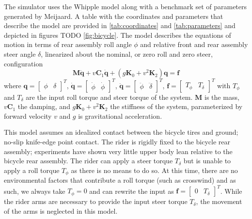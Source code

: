 \documentclass[11pt,a4paper,reqno]{amsart}
\newcommand{\mass}{\bm{M}}
\newcommand{\damping}{v \bm{C}_1}
\newcommand{\stiffness}{g \bm{K}_0 + v^2 \bm{K}_2}
\newcommand{\roll}{\phi}
\newcommand{\steer}{\delta}
\newcommand{\rollRate}{\dot{\phi}}
\newcommand{\steerRate}{\dot{\phi}}
\begin{document}
The simulator uses the Whipple model\cite{whipple1899} along with a benchmark set of parameters generated by
Meijaard\cite{meijaard2007}.
A table with the coordinates and parameters that describe the model are provided in
\autoref{tab:coordinates} and \autoref{tab:parameters} and depicted in figures TODO \autoref{fig:bicycle}.
The model describes the equations of motion in terms of rear assembly roll angle $\roll$ and relative front and rear
assembly steer angle $\steer$, linearized about the nominal, or zero roll and zero steer, configuration
\begin{equation}
    \mass \ddot{\bm{q}} + \damping \dot{\bm{q}} + (\stiffness) \bm{q} = \bm{f} \label{eq:eom}
\end{equation}
where
$ \bm{q} = \begin{bmatrix} \roll & \steer \end{bmatrix}^T $,
$ \dot{\bm{q}} = \begin{bmatrix} \rollRate & \steerRate \end{bmatrix}^T $,
$ \ddot{\bm{q}} = \begin{bmatrix} \ddot{\roll} & \ddot{\steer} \end{bmatrix}^T $,
$ \bm{f} = \begin{bmatrix} T_\roll & T_\steer \end{bmatrix}^T $ with $ T_\roll $ and $ T_\steer$ are the input roll
torque and steer torque of the system.
$ \mass $ is the mass, $ \damping $ the damping, and $ \stiffness $ the stiffness of the system,
parameterized by forward velocity $ v $ and $ g $ is gravitational acceleration.

This model assumes an idealized contact between the bicycle tires and ground; no-slip knife-edge point contact.
The rider is rigidly fixed to the bicycle rear assembly; experiments have shown very little upper body lean relative to
the bicycle rear assembly\cite{kooijman2009}.
The rider can apply a steer torque $ T_\steer $ but is unable to apply a roll torque $ T_\roll $ as there is no means to
do so. At this time, there are no environmental factors that contribute a roll torque (such as crosswind) and as such,
we always take $ T_\roll = 0 $ and can rewrite the input as $ \bm{f} = \begin{bmatrix} 0  & T_\steer \end{bmatrix}^T $.
While the rider arms are necessary to provide the input steer torque $ T_\steer $, the movement of the arms is
neglected in this model.
\end{document}
